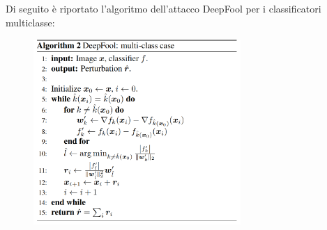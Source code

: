        Di seguito è riportato l'algoritmo dell'attacco DeepFool per i classificatori multiclasse:
            \begin{figure}[h!]
                \centering
                \includegraphics[width=0.7\textwidth]{Images/DeepFool/Deepfool_3.png}
                \caption{}
                \label{DeepFool_3}
            \end{figure}
        
